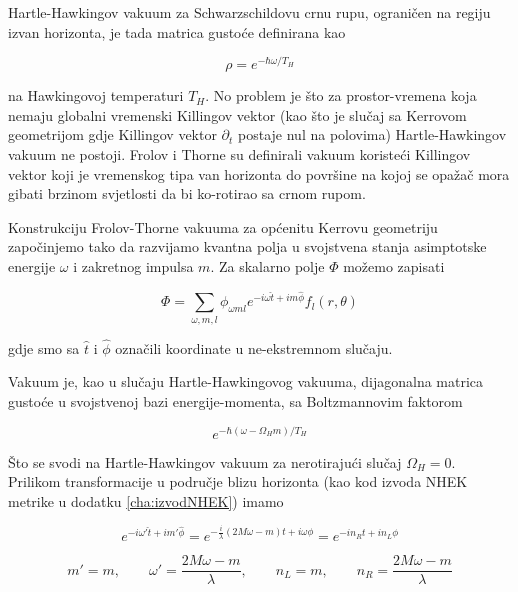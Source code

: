 \noindent Hartle-Hawkingov vakuum za Schwarzschildovu crnu rupu, ograničen na regiju izvan horizonta, je tada matrica gustoće definirana kao

\begin{equation}
\rho=e^{-\hbar\omega/T_H}
\end{equation}

\noindent na Hawkingovoj temperaturi $T_H$. No problem je što za prostor-vremena koja nemaju globalni vremenski Killingov vektor (kao što je slučaj sa Kerrovom geometrijom gdje Killingov vektor $\partial_t$ postaje nul na polovima) Hartle-Hawkingov vakuum ne postoji.
Frolov i Thorne \citep{FrolovThorne} su definirali vakuum koristeći Killingov vektor koji je vremenskog tipa van horizonta do površine na kojoj se opažač mora gibati brzinom svjetlosti da bi ko-rotirao sa crnom rupom.

Konstrukciju Frolov-Thorne vakuuma za općenitu Kerrovu geometriju započinjemo tako da razvijamo kvantna polja u svojstvena stanja asimptotske energije $\omega$ i zakretnog impulsa $m$. Za skalarno polje $\Phi$ možemo zapisati

\begin{equation}
\Phi=\sum_{\omega,m,l}\phi_{\omega m l}e^{-i\omega \hat{t}+im\hat{\phi}}f_{l}(r,\theta)
\end{equation}

\noindent gdje smo sa $\hat{t}$ i $\hat{\phi}$ označili koordinate u ne-ekstremnom slučaju.

Vakuum je, kao u slučaju Hartle-Hawkingovog vakuuma, dijagonalna matrica gustoće u svojstvenoj bazi energije-momenta, sa Boltzmannovim faktorom

\begin{equation}
e^{-\hbar(\omega-\Omega_H m)/T_H}
\end{equation}

\noindent Što se svodi na Hartle-Hawkingov vakuum za nerotirajući slučaj $\Omega_H=0$. Prilikom transformacije u područje blizu horizonta (kao kod izvoda NHEK metrike u dodatku \ref{cha:izvodNHEK}) imamo

\begin{equation}
e^{-i\omega' \hat{t}+im'\hat{\phi}}=e^{-\frac{i}{\lambda}(2M\omega-m)t+i\omega\phi}=e^{-in_Rt+in_L\phi}
\end{equation}

\begin{equation*}
m'=m,\qquad \omega'=\frac{2M\omega-m}{\lambda},\qquad n_L=m,\qquad n_R=\frac{2M\omega-m}{\lambda}
\end{equation*}


